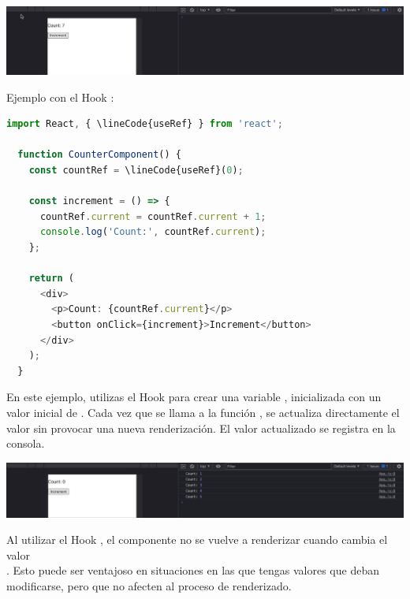 \begin{center}
	\includegraphics[width=17cm]{prueba} %
\end{center}

\newpage %

Ejemplo con el Hook :
\vspace{0.2cm} %

\begin{lstlisting}[language=TypeScript, style=mystyle]
  import React, { \lineCode{useRef} } from 'react';

  function CounterComponent() {
    const countRef = \lineCode{useRef}(0);

    const increment = () => {
      countRef.current = countRef.current + 1;
      console.log('Count:', countRef.current);
    };

    return (
      <div>
        <p>Count: {countRef.current}</p>
        <button onClick={increment}>Increment</button>
      </div>
    );
  }
\end{lstlisting}

En este ejemplo, utilizas el Hook  para crear una variable , inicializada con un valor inicial de . Cada vez que se llama a la función , se actualiza directamente el valor  sin provocar una nueva renderización. El valor actualizado se registra en la consola.
\vspace{0.2cm} %

\begin{center}
	\includegraphics[width=17cm]{prueba2}
\end{center}

Al utilizar el Hook , el componente no se vuelve a renderizar cuando cambia el valor\\ . Esto puede ser ventajoso en situaciones en las que tengas valores que deban modificarse, pero que no afecten al proceso de renderizado.

